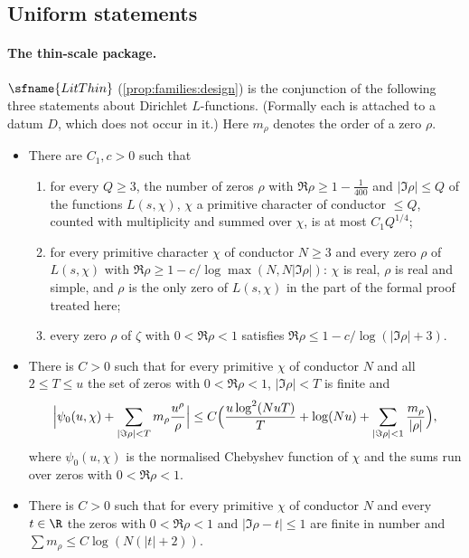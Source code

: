 \subsection{Uniform statements}\label{sec:pf:stageU:uniform}

\paragraph{The thin-scale package.}
$\sfname{LitThin}$ (\cref{prop:families:design}) is the conjunction of the following three statements about Dirichlet
$L$-functions. (Formally each is attached to a datum $D$, which does not occur in it.) Here $m_\rho$ denotes the order of a
zero $\rho$.
\begin{itemize}
\item[(Z)] There are $C_1,c>0$ such that
\begin{enumerate}[label=(Z\arabic*)]
\item for every $Q\ge3$, the number of zeros $\rho$ with $\Re\rho\ge1-\frac1{400}$ and $|\Im\rho|\le Q$ of the functions $L(s,\chi)$,
$\chi$ a primitive character of conductor $\le Q$, counted with multiplicity and summed over $\chi$, is at most
$C_1Q^{1/4}$;
\item for every primitive character $\chi$ of conductor $N\ge3$ and every zero $\rho$ of $L(s,\chi)$ with
$\Re\rho\ge1-c/\log\max(N,N|\Im\rho|)$: $\chi$ is real, $\rho$ is real and simple, and $\rho$ is the only zero of $L(s,\chi)$ in
the part of the formal proof treated here;
\item every zero $\rho$ of $\zeta$ with $0<\Re\rho<1$ satisfies $\Re\rho\le1-c/\log(|\Im\rho|+3)$.
\end{enumerate}
\item[(EF)] There is $C>0$ such that for every primitive $\chi$ of conductor $N$ and all $2\le T\le u$ the set of zeros with
$0<\Re\rho<1$, $|\Im\rho|<T$ is finite and
\[
\Bigl|\psi_0(u,\chi)+\sum_{|\Im\rho|<T}m_\rho\frac{u^\rho}\rho\Bigr|\le C\Bigl(\frac{u\log^2(NuT)}T+\log(Nu)
+\sum_{|\Im\rho|<1}\frac{m_\rho}{|\rho|}\Bigr),
\]
where $\psi_0(u,\chi)$ is the normalised Chebyshev function of $\chi$ and the sums run over zeros with $0<\Re\rho<1$.
\item[(ZC)] There is $C>0$ such that for every primitive $\chi$ of conductor $N$ and every $t\in\R$ the zeros with
$0<\Re\rho<1$ and $|\Im\rho-t|\le1$ are finite in number and $\sum m_\rho\le C\log(N(|t|+2))$.
\end{itemize}

